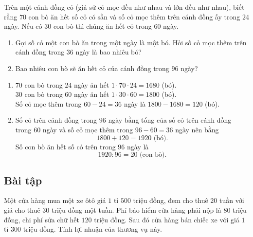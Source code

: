 \begin{vd}
	Trên một cánh đồng cỏ (giả sử cỏ mọc đều như nhau và lớn đều như nhau), biết rằng $70$ con bò ăn hết số cỏ có sẵn và số cỏ mọc thêm trên cánh đồng ấy trong $24$ ngày. Nếu có $30$ con bò thì chúng ăn hết cỏ trong $60$ ngày.
	\begin{enumerate}
		\item Gọi số cỏ một con bò ăn trong một ngày là một bó. Hỏi số cỏ mọc thêm trên cánh đồng trong $36$ ngày là bao nhiêu bó?
		\item Bao nhiêu con bò sẽ ăn hết cỏ của cánh đồng trong $96$ ngày?
	\end{enumerate}
	\loigiai
	{
		\begin{enumerate}
			\item $70$ con bò trong $24$ ngày ăn hết $1 \cdot 70 \cdot 24 = 1680$ (bó).\\
			$30$ con bò trong $60$ ngày ăn hết $1 \cdot 30 \cdot 60 = 1800$ (bó).\\
			Số cỏ mọc thêm trong $60-24 = 36$ ngày là $1800 - 1680 = 120$ (bó).
			\item Số cỏ trên cánh đồng trong $96$ ngày bằng tổng của số cỏ trên cánh đồng trong $60$ ngày và số cỏ mọc thêm trong $96 - 60 = 36$ ngày nên bằng 
			\[1800+120 = 1920 \text{ (bó).}\]
			Số con bò ăn hết số cỏ trên trong $96$ ngày là
			\[1920:96 = 20\text{ (con bò).}\]
		\end{enumerate}
	}
\end{vd}
\subsection{Bài tập}
\begin{bt}
	Một cửa hàng mua một xe ôtô giá $1$ tỉ $500$ triệu đồng, đem cho thuê $20$ tuần với giá cho thuê $30$ triệu đồng một tuần. Phí bảo hiểm cửa hàng phải nộp là $80$ triệu đồng, chi phí sửa chữ hết $120$ triệu đồng. Sau đó cửa hàng bán chiếc xe với giá $1$ tỉ $300$ triệu đồng. Tính lợi nhuận của thương vụ này.
\end{bt}

